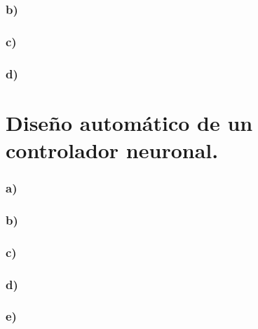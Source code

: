 \documentclass[a4paper, 12pt]{article}
\begin{document}
    \section{b)}
    
    \section{c)}
    
    \section{d)}

                
    \part{Diseño automático de un controlador neuronal.}
	
	
    \section{a)}
	
    \section{b)}
    
    \section{c)}
    
    \section{d)}
    
    \section{e)}
	
	
	
 
\end{document}
